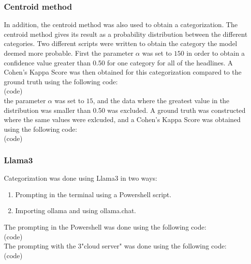 \begin{flushleft}
\subsubsection{Centroid method}

In addition, the centroid method was also used to obtain a categorization. 
The centroid method gives its result as a probability distribution between the different categories. 
Two different scripts were written to obtain the category the model deemed more probable.
First the parameter $\alpha$ was set to $150$ in order to obtain a confidence value greater than 0.50 for one category for all of the headlines. 
A Cohen's Kappa Score was then obtained for this categorization compared to the ground truth using the following code:\\
(code)\\
the parameter $\alpha$ was set to $15$, and the data where the greatest value in the distribution was smaller than 0.50 was excluded. 
A ground truth was constructed where the same values were exlcuded, 
and a Cohen's Kappa Score was obtained using the following code:\\
(code)\\

\subsubsection{Llama3}
Categorization was done using Llama3 in two ways: 
\begin{enumerate}
\item Prompting in the terminal using a Powershell script.
\item Importing ollama and using ollama.chat.
\end{enumerate}

The prompting in the Powershell was done using the following code:\\
(code)\\

The prompting with the 3"cloud server" was done using the following code:\\
(code)\\


\end{flushleft}
